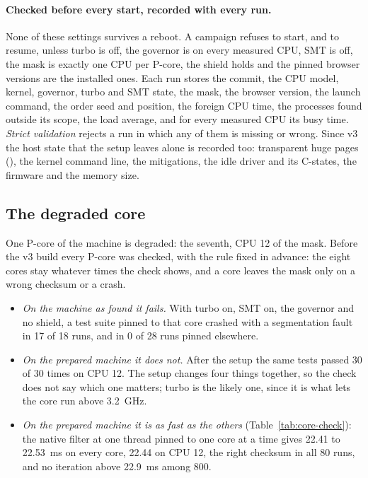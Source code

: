 \paragraph{Checked before every start, recorded with every run.} None of
these settings survives a reboot. A campaign refuses to start, and to
resume, unless turbo is off, the governor is  on every
measured CPU, SMT is off, the mask is exactly one CPU per P-core, the shield
holds and the pinned browser versions are the installed ones. Each run
stores the commit, the CPU model, kernel, governor, turbo and SMT state, the
mask, the browser version, the launch command, the order seed and position,
the foreign CPU time, the processes found outside its scope, the load
average, and for every measured CPU its busy time. \emph{Strict validation}
rejects a run in which any of them is missing or wrong. Since v3 the host
state that the setup leaves alone is recorded too: transparent huge pages
(), the kernel command line, the mitigations, the idle driver
and its C-states, the firmware and the memory size.

\subsection{The degraded core}
\label{sec:core}

One P-core of the machine is degraded: the seventh, CPU 12 of the mask.
Before the v3 build every P-core was checked, with the rule fixed in
advance: the eight cores stay whatever times the check shows, and a core
leaves the mask only on a wrong checksum or a crash.

\begin{itemize}[leftmargin=1.5em]
\item \emph{On the machine as found it fails.} With turbo on, SMT on, the
governor  and no shield, a test suite pinned to that core
crashed with a segmentation fault in 17 of 18 runs, and in 0 of 28 runs
pinned elsewhere.
\item \emph{On the prepared machine it does not.} After the setup the same
tests passed 30 of 30 times on CPU 12. The setup changes four things
together, so the check does not say which one matters; turbo is the likely
one, since it is what lets the core run above 3.2~GHz.
\item \emph{On the prepared machine it is as fast as the others}
(Table~\ref{tab:core-check}): the native filter at one thread pinned to one
core at a time gives 22.41 to 22.53~ms on every core, 22.44 on CPU 12, the
right checksum in all 80 runs, and no iteration above 22.9~ms among 800.
\end{itemize}

